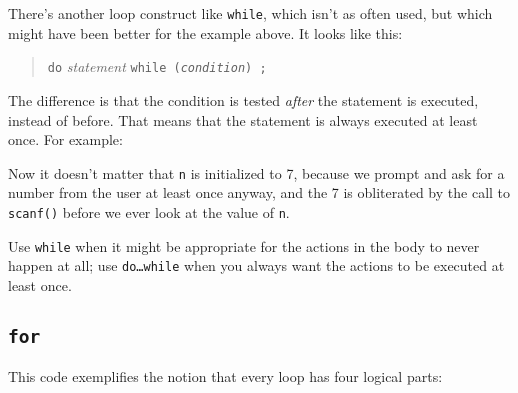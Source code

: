 There's another loop construct like {\tt while}, which isn't as often
used, but which might have been better for the example above.  It looks
like this:

\begin{quote}
{\tt do} {\em statement}\/ {\tt while ({\em condition}\/) ;}
\end{quote}

The difference is that the condition is tested {\em after}\/ the
statement is executed, instead of before.  That means that the statement
is always executed at least once.  For example:


\noindent Now it doesn't matter that {\tt n} is initialized to 7,
because we prompt and ask for a number from the user at least once
anyway, and the 7 is obliterated by the call to {\tt scanf()} before we
ever look at the value of {\tt n}.

Use {\tt while} when it might be appropriate for the actions in the body
to never happen at all; use {\tt do{\rm\ldots}while} when you always
want the actions to be executed at least once.

\subsection{{\tt for}}

This code exemplifies the notion that every loop has four logical
parts:


